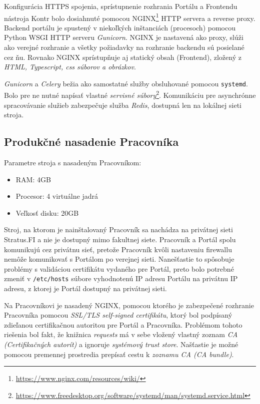 \documentclass[
  digital, %
  twoside, %
  table,   %
  lof,     %
  lot,     %
]{fithesis3}
\begin{document}
Konfigurácia HTTPS spojenia, sprístupnenie rozhrania Portálu a Frontendu nástroja Kontr bolo dosiahnuté pomocou NGINX\footnote{\url{https://www.nginx.com/resources/wiki/}} HTTP servera a reverse proxy. Backend portálu je spustený v niekoľkých inštanciách (procesoch) pomocou Python WSGI HTTP serveru \emph{Gunicorn}. NGINX je nastavená ako proxy, slúži ako verejné rozhranie a všetky požiadavky na rozhranie backendu sú posielané cez ňu. Rovnako NGINX sprístupňuje aj statický obsah (Frontend), zložený z \emph{HTML, Typescript, css súborov a obrázkov}.

\emph{Gunicorn} a \emph{Celery} bežia ako samostatné služby obsluhované pomocou \texttt{systemd}. Bolo pre ne nutné napísať vlastné \emph{servisné súbory}\footnote{\url{https://www.freedesktop.org/software/systemd/man/systemd.service.html}}. Komunikáciu pre asynchrónne spracovávanie služieb zabezpečuje služba \emph{Redis}, dostupná len na lokálnej sieti stroja.

\subsection{Produkčné nasadenie Pracovníka}

Parametre stroja s nasadeným Pracovníkom:
\begin{itemize}
    \item RAM: 4GB
    \item Procesor: 4 virtuálne jadrá
    \item Veľkosť disku: 20GB
\end{itemize}

Stroj, na ktorom je nainštalovaný Pracovník sa nachádza na privátnej sieti Stratus.FI a nie je dostupný mimo fakultnej siete. Pracovník a Portál spolu komunikujú cez privátnu sieť, pretože Pracovník kvôli nastaveniu firewallu nemôže komunikovať s Portálom po verejnej sieti. Nanešťastie to spôsobuje problémy s validáciou certifikátu vydaného pre Portál, preto bolo potrebné zmeniť v \texttt{/etc/hosts} súbore vyhodnotenú IP adresu Portálu na privátnu IP adresu, z ktorej je Portál dostupný na privátnej sieti.

Na Pracovníkovi je nasadený NGINX, pomocou ktorého je zabezpečené rozhranie Pracovníka pomocou \emph{SSL/TLS self-signed certifikátu}, ktorý bol podpísaný zdieľanou certifikačnou autoritou pre Portál a Pracovníka. Problémom tohoto riešenia bol fakt, že knižnica \emph{requests} má v sebe vložený vlastný zoznam \emph{CA (Certifikačných autorít)}\cite{RFC5280} a ignoruje \emph{systémový trust store}. Našťastie je možné pomocou premennej prostredia prepísať cestu k \emph{zoznamu CA (CA bundle)}.
\end{document}
